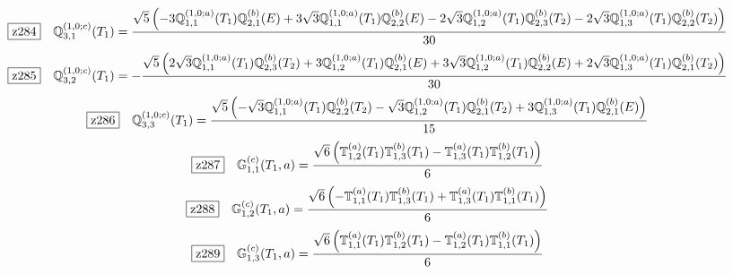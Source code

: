 \documentclass[fleqn,10pt,landscape]{jsarticle}
\begin{document}
\begin{dmath*}
\hspace*{3mm}\fbox{z284}\quad \mathbb{Q}_{3,1}^{(1,0;c)}(T_{1})=\frac{\sqrt{5} \left(- 3 \mathbb{Q}_{1,1}^{(1,0;a)}(T_{1}) \mathbb{Q}_{2,1}^{(b)}(E) + 3 \sqrt{3} \mathbb{Q}_{1,1}^{(1,0;a)}(T_{1}) \mathbb{Q}_{2,2}^{(b)}(E) - 2 \sqrt{3} \mathbb{Q}_{1,2}^{(1,0;a)}(T_{1}) \mathbb{Q}_{2,3}^{(b)}(T_{2}) - 2 \sqrt{3} \mathbb{Q}_{1,3}^{(1,0;a)}(T_{1}) \mathbb{Q}_{2,2}^{(b)}(T_{2})\right)}{30}
\end{dmath*}
\begin{dmath*}
\hspace*{3mm}\fbox{z285}\quad \mathbb{Q}_{3,2}^{(1,0;c)}(T_{1})=- \frac{\sqrt{5} \left(2 \sqrt{3} \mathbb{Q}_{1,1}^{(1,0;a)}(T_{1}) \mathbb{Q}_{2,3}^{(b)}(T_{2}) + 3 \mathbb{Q}_{1,2}^{(1,0;a)}(T_{1}) \mathbb{Q}_{2,1}^{(b)}(E) + 3 \sqrt{3} \mathbb{Q}_{1,2}^{(1,0;a)}(T_{1}) \mathbb{Q}_{2,2}^{(b)}(E) + 2 \sqrt{3} \mathbb{Q}_{1,3}^{(1,0;a)}(T_{1}) \mathbb{Q}_{2,1}^{(b)}(T_{2})\right)}{30}
\end{dmath*}
\begin{dmath*}
\hspace*{3mm}\fbox{z286}\quad \mathbb{Q}_{3,3}^{(1,0;c)}(T_{1})=\frac{\sqrt{5} \left(- \sqrt{3} \mathbb{Q}_{1,1}^{(1,0;a)}(T_{1}) \mathbb{Q}_{2,2}^{(b)}(T_{2}) - \sqrt{3} \mathbb{Q}_{1,2}^{(1,0;a)}(T_{1}) \mathbb{Q}_{2,1}^{(b)}(T_{2}) + 3 \mathbb{Q}_{1,3}^{(1,0;a)}(T_{1}) \mathbb{Q}_{2,1}^{(b)}(E)\right)}{15}
\end{dmath*}
\begin{dmath*}
\hspace*{3mm}\fbox{z287}\quad \mathbb{G}_{1,1}^{(c)}(T_{1},a)=\frac{\sqrt{6} \left(\mathbb{T}_{1,2}^{(a)}(T_{1}) \mathbb{T}_{1,3}^{(b)}(T_{1}) - \mathbb{T}_{1,3}^{(a)}(T_{1}) \mathbb{T}_{1,2}^{(b)}(T_{1})\right)}{6}
\end{dmath*}
\begin{dmath*}
\hspace*{3mm}\fbox{z288}\quad \mathbb{G}_{1,2}^{(c)}(T_{1},a)=\frac{\sqrt{6} \left(- \mathbb{T}_{1,1}^{(a)}(T_{1}) \mathbb{T}_{1,3}^{(b)}(T_{1}) + \mathbb{T}_{1,3}^{(a)}(T_{1}) \mathbb{T}_{1,1}^{(b)}(T_{1})\right)}{6}
\end{dmath*}
\begin{dmath*}
\hspace*{3mm}\fbox{z289}\quad \mathbb{G}_{1,3}^{(c)}(T_{1},a)=\frac{\sqrt{6} \left(\mathbb{T}_{1,1}^{(a)}(T_{1}) \mathbb{T}_{1,2}^{(b)}(T_{1}) - \mathbb{T}_{1,2}^{(a)}(T_{1}) \mathbb{T}_{1,1}^{(b)}(T_{1})\right)}{6}
\end{dmath*}
\end{document}
